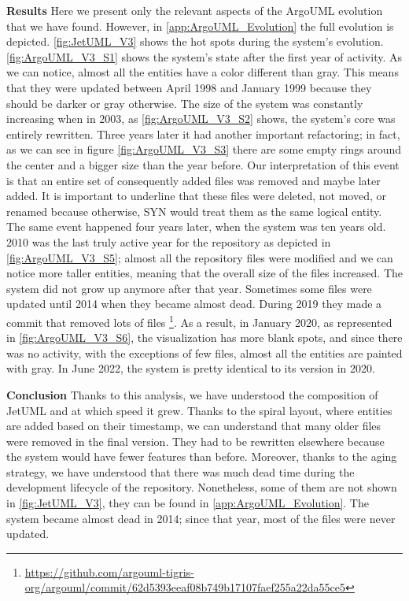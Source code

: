\textbf{Results}
Here we present only the relevant aspects of the ArgoUML evolution that we have found. However, in \autoref{app:ArgoUML_Evolution} the full evolution is depicted. \autoref{fig:JetUML_V3} shows the hot spots during the system's evolution. \autoref{fig:ArgoUML_V3_S1} shows the system's state after the first year of activity. As we can notice, almost all the entities have a color different than gray. This means that they were updated between April 1998 and January 1999 because they should be darker or gray otherwise. The size of the system was constantly increasing when in 2003, as \autoref{fig:ArgoUML_V3_S2} shows, the system's core was entirely rewritten. Three years later it had another important refactoring; in fact, as we can see in figure \autoref{fig:ArgoUML_V3_S3} there are some empty rings around the center and a bigger size than the year before. Our interpretation of this event is that an entire set of consequently added files was removed and maybe later added. It is important to underline that these files were deleted, not moved, or renamed because otherwise, SYN would treat them as the same logical entity. The same event happened four years later, when the system was ten years old. 2010 was the last truly active year for the repository as depicted in \autoref{fig:ArgoUML_V3_S5}; almost all the repository files were modified and we can notice more taller entities, meaning that the overall size of the files increased. The system did not grow up anymore after that year. Sometimes some files were updated until 2014 when they became almost dead. During 2019 they made a commit that removed lots of files \footnote{\url{https://github.com/argouml-tigris-org/argouml/commit/62d5393eeaf08b749b17107faef255a22da55ce5}}. As a result, in January 2020, as represented in \autoref{fig:ArgoUML_V3_S6}, the visualization has more blank spots, and since there was no activity, with the exceptions of few files, almost all the entities are painted with gray. In June 2022, the system is pretty identical to its version in 2020. 

\bigbreak
\textbf{Conclusion}
Thanks to this analysis, we have understood the composition of JetUML and at which speed it grew. Thanks to the spiral layout, where entities are added based on their timestamp, we can understand that many older files were removed in the final version. They had to be rewritten elsewhere because the system would have fewer features than before. Moreover, thanks to the aging strategy, we have understood that there was much dead time during the development lifecycle of the repository. Nonetheless, some of them are not shown in \autoref{fig:JetUML_V3}, they can be found in \autoref{app:ArgoUML_Evolution}. The system became almost dead in 2014; since that year, most of the files were never updated. 



